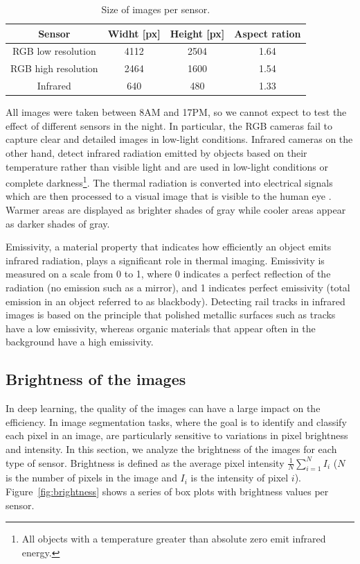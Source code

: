 \documentclass[Master,MDS,english]{BASE/twbook} %
\begin{document}
\begin{table}[h!]
\begin{center}
\begin{tabular}{|c| c c c|} 
  \hline
 Sensor &	Widht [px] &	Height [px] &	Aspect ration \\
 \hline
RGB low resolution &	4112 &	2504 &	1.64 \\
 \hline
RGB high resolution &	2464 &	1600 &	1.54 \\
 \hline
Infrared	& 640 &	480 &	1.33 \\
 \hline
\end{tabular}
\caption{Size of images per sensor.}
\label{tab:1}
\end{center}
\end{table}


All images were taken between 8AM and 17PM, so we cannot expect to test the effect of different sensors in the night. In particular, the RGB cameras fail to capture clear and detailed images in low-light conditions. 
Infrared cameras on the other hand, detect infrared radiation emitted by objects based on their temperature rather than visible light and are used in low-light conditions or complete darkness\footnote{All objects with a temperature greater than absolute zero emit infrared energy.}. The thermal radiation is converted into electrical signals which are then processed to a visual image that is visible to the human eye \citep{CLARK200283}. Warmer areas are displayed as brighter shades of gray while cooler areas appear as darker shades of gray.

Emissivity, a material property that indicates how efficiently an object emits infrared radiation, plays a significant role in thermal imaging. Emissivity is measured on a scale from 0 to 1, where 0 indicates a perfect reflection of the radiation (no emission such as a mirror), and 1 indicates perfect emissivity (total emission in an object referred to as blackbody).  Detecting rail tracks in infrared images is based on the principle that polished metallic surfaces such as tracks have a low emissivity, whereas organic materials that appear often in the background have a high emissivity.  


\subsection{Brightness of the images}


In deep learning, the quality of the images can have a large impact on the efficiency. In image segmentation tasks, where the goal is to identify and classify each pixel in an image, are particularly sensitive to variations in pixel brightness and intensity.
In this section, we analyze the brightness of the images for each type of sensor. Brightness is defined as the average pixel intensity $\frac{1}{N} \sum_{i=1}^{N} I_i $ ($N$ is the number of pixels in the image and $I_i$ is the intensity of pixel $i$). Figure~\ref{fig:brightness} shows a series of box plots with brightness values per sensor.
\end{document}
